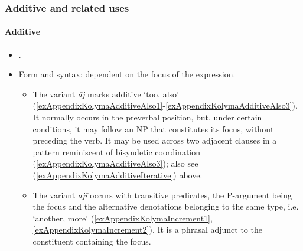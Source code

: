 \subsubsection{Additive and related uses}
\paragraph{Additive}\label{appendixKolymaAdditive}
\begin{itemize}
	\item \textcite[528–535]{Maslova2003}.
	\item Form and syntax: dependent on the focus of the expression.
	\begin{itemize}
		\item The variant \textit{āj} marks additive \lq too, also\rq{ } (\ref{exAppendixKolymaAdditiveAlso1}-\ref{exAppendixKolymaAdditiveAlso3}). It normally occurs in the preverbal position, but, under certain conditions, it may follow an NP that constitutes its focus, without preceding the verb.  It may be used across two adjacent clauses in a pattern reminiscent of bisyndetic coordination (\ref{exAppendixKolymaAdditiveAlso3}); also see (\ref{exAppendixKolymaAdditiveIterative}) above.
		\item The variant \textit{ajī} occurs with transitive predicates, the P-argument being the focus and the alternative denotations belonging to the same type, i.e. \lq another, more\rq{ }(\ref{exAppendixKolymaIncrement1}, \ref{exAppendixKolymaIncrement2}). It is a phrasal adjunct to the constituent containing the focus.
	\end{itemize}	
\end{itemize}

